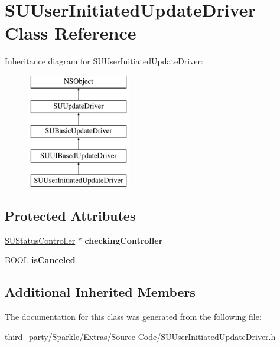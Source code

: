 \hypertarget{interface_s_u_user_initiated_update_driver}{}\section{S\+U\+User\+Initiated\+Update\+Driver Class Reference}
\label{interface_s_u_user_initiated_update_driver}
Inheritance diagram for S\+U\+User\+Initiated\+Update\+Driver\+:\begin{figure}[H]
\begin{center}
\leavevmode
\includegraphics[height=5.000000cm]{interface_s_u_user_initiated_update_driver}
\end{center}
\end{figure}
\subsection*{Protected Attributes}
\begin{DoxyCompactItemize}
\item 
\mbox{\label{interface_s_u_user_initiated_update_driver_a3390e672c910beb0afe1c4f1fef9d9cd}} 
\mbox{\hyperlink{interface_s_u_status_controller}{S\+U\+Status\+Controller}} $\ast$ {\bfseries checking\+Controller}
\item 
\mbox{\label{interface_s_u_user_initiated_update_driver_af8c307ad6fddac0c5e94297b83cdd6cd}} 
B\+O\+OL {\bfseries is\+Canceled}
\end{DoxyCompactItemize}
\subsection*{Additional Inherited Members}


The documentation for this class was generated from the following file\+:\begin{DoxyCompactItemize}
\item 
third\+\_\+party/\+Sparkle/\+Extras/\+Source Code/S\+U\+User\+Initiated\+Update\+Driver.\+h\end{DoxyCompactItemize}
